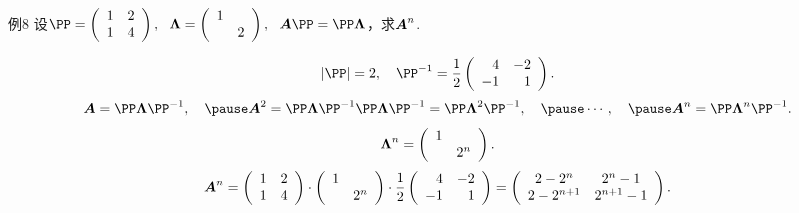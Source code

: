 \begin{frame}
  \begin{footnotesize}
    \begin{exampleblock}{例8}
      设$\PP = \left(
      \begin{array}{cc}
        1 & 2\\
        1 & 4
      \end{array}
      \right), ~~ \LLambda=\left(
      \begin{array}{cc}
        1 & \\
         & 2
      \end{array}
      \right), ~~ \A\PP=\PP\LLambda$，求$\boldsymbol{A}^n$.
    \end{exampleblock}
    \pause
    \jiename
    $$
    |\PP|=2, \quad \PP^{-1} = \frac12 \left(
    \begin{array}{rr}
      4 & -2\\
      -1 & 1
    \end{array}
    \right).
    $$
    \pause
    $$
    \A = \PP\LLambda\PP^{-1}, \quad \pause
    \A^2 = \PP\LLambda\PP^{-1}\PP\LLambda\PP^{-1} = \PP\LLambda^2\PP^{-1}, \quad \pause
    \cd, \quad \pause
    \A^n = \PP\LLambda^n\PP^{-1}.
    $$
    \pause 
    $$
    \boldsymbol{\Lambda}^n = \left(
    \begin{array}{cc}
      1 & \\
      & 2^n
    \end{array}
    \right).
    $$
    \pause 
    $$
    \boldsymbol{A}^n =  \left(
    \begin{array}{cc}
      1 & 2\\
      1 & 4
    \end{array}
    \right) \cdot \left(
    \begin{array}{cc}
      1 & \\
      & 2^n
    \end{array}
    \right) \cdot \frac12 \left(
    \begin{array}{rr}
      4 & -2\\
      -1 & 1
    \end{array}
    \right) = \left(
    \begin{array}{cc}
      2-2^n & 2^n-1\\
      2-2^{n+1} & 2^{n+1}-1
    \end{array}
    \right).
    $$
  \end{footnotesize}
\end{frame}


